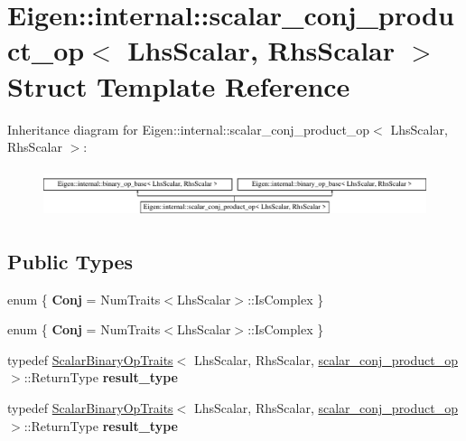 \hypertarget{struct_eigen_1_1internal_1_1scalar__conj__product__op}{}\section{Eigen\+:\+:internal\+:\+:scalar\+\_\+conj\+\_\+product\+\_\+op$<$ Lhs\+Scalar, Rhs\+Scalar $>$ Struct Template Reference}
\label{struct_eigen_1_1internal_1_1scalar__conj__product__op}
Inheritance diagram for Eigen\+:\+:internal\+:\+:scalar\+\_\+conj\+\_\+product\+\_\+op$<$ Lhs\+Scalar, Rhs\+Scalar $>$\+:\begin{figure}[H]
\begin{center}
\leavevmode
\includegraphics[height=1.432225cm]{struct_eigen_1_1internal_1_1scalar__conj__product__op}
\end{center}
\end{figure}
\subsection*{Public Types}
\begin{DoxyCompactItemize}
\item 
\mbox{\label{struct_eigen_1_1internal_1_1scalar__conj__product__op_a1c470988b8606372fca9b761d3119a02}} 
enum \{ {\bfseries Conj} = Num\+Traits$<$Lhs\+Scalar$>$\+:\+:Is\+Complex
 \}
\item 
\mbox{\label{struct_eigen_1_1internal_1_1scalar__conj__product__op_ab1b1ff49c84dda309a9dcef161d6f94b}} 
enum \{ {\bfseries Conj} = Num\+Traits$<$Lhs\+Scalar$>$\+:\+:Is\+Complex
 \}
\item 
\mbox{\label{struct_eigen_1_1internal_1_1scalar__conj__product__op_a123d7697ac23673cd7d4f1645dd6dd17}} 
typedef \hyperlink{group___core___module_struct_eigen_1_1_scalar_binary_op_traits}{Scalar\+Binary\+Op\+Traits}$<$ Lhs\+Scalar, Rhs\+Scalar, \hyperlink{struct_eigen_1_1internal_1_1scalar__conj__product__op}{scalar\+\_\+conj\+\_\+product\+\_\+op} $>$\+::Return\+Type {\bfseries result\+\_\+type}
\item 
\mbox{\label{struct_eigen_1_1internal_1_1scalar__conj__product__op_a123d7697ac23673cd7d4f1645dd6dd17}} 
typedef \hyperlink{group___core___module_struct_eigen_1_1_scalar_binary_op_traits}{Scalar\+Binary\+Op\+Traits}$<$ Lhs\+Scalar, Rhs\+Scalar, \hyperlink{struct_eigen_1_1internal_1_1scalar__conj__product__op}{scalar\+\_\+conj\+\_\+product\+\_\+op} $>$\+::Return\+Type {\bfseries result\+\_\+type}
\end{DoxyCompactItemize}
